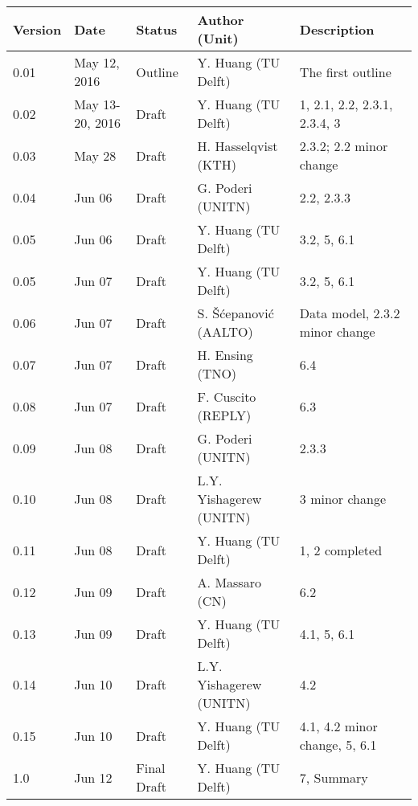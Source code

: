 {
\begin{tabularx}{\textwidth}{|l|l|l|>{\raggedright\arraybackslash}p{4cm}|X|}
\hline
\textbf{Version}	& \textbf{Date} &	\textbf{Status} &	\textbf{Author (Unit)} &	\textbf{Description}  \\ \hline
0.01 & May 12, 2016 & Outline & Y. Huang (TU Delft) & The first outline\\ \hline
0.02 & May 13-20, 2016 & Draft & Y. Huang (TU Delft) & 1, 2.1, 2.2, 2.3.1, 2.3.4, 3\\ \hline
0.03 & May 28 & Draft & H. Hasselqvist (KTH) &  2.3.2; 2.2 minor change\\ \hline
0.04 & Jun 06 & Draft &  G. Poderi (UNITN) & 2.2, 2.3.3 \\ \hline
0.05 & Jun 06 & Draft & Y. Huang (TU Delft) & 3.2, 5, 6.1 \\ \hline
0.05 & Jun 07 & Draft & Y. Huang (TU Delft) & 3.2, 5, 6.1 \\ \hline
0.06 & Jun 07 & Draft &  S. \v{S}\'{c}epanovi\'{c} (AALTO) & Data model, 2.3.2 minor change \\ \hline
0.07 & Jun 07 & Draft &  H. Ensing (TNO) & 6.4 \\ \hline
0.08 & Jun 07 & Draft &  F. Cuscito (REPLY) & 6.3 \\ \hline
0.09 & Jun 08 & Draft &  G. Poderi (UNITN) & 2.3.3 \\ \hline
0.10 & Jun 08 & Draft &  L.Y. Yishagerew (UNITN) & 3 minor change \\ \hline
0.11 & Jun 08 & Draft & Y. Huang (TU Delft) & 1, 2 completed \\ \hline
0.12 & Jun 09 & Draft & A. Massaro  (CN) & 6.2 \\ \hline
0.13 & Jun 09 & Draft & Y. Huang (TU Delft) & 4.1, 5, 6.1 \\ \hline
0.14 & Jun 10 & Draft & L.Y. Yishagerew (UNITN) & 4.2 \\ \hline
0.15 & Jun 10 & Draft & Y. Huang (TU Delft) & 4.1, 4.2 minor change, 5, 6.1 \\ \hline
1.0 & Jun 12 & Final Draft & Y. Huang (TU Delft) & 7, Summary \\ \hline

\end{tabularx}
}


